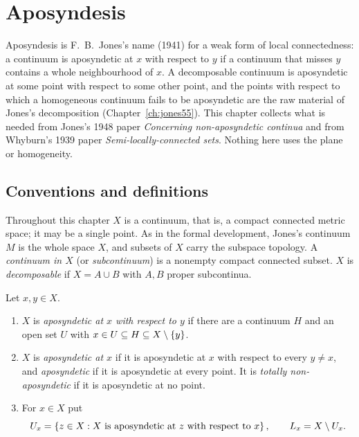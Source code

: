 \chapter{Aposyndesis}\label{ch:apos}

Aposyndesis is F.~B.~Jones's name (1941) for a weak form of local connectedness: a continuum is
aposyndetic at $x$ with respect to $y$ if a continuum that misses $y$ contains a whole neighbourhood of
$x$. A decomposable continuum is aposyndetic at some point with respect to some other point, and the
points with respect to which a homogeneous continuum fails to be aposyndetic are the raw material of
Jones's decomposition (Chapter~\ref{ch:jones55}). This chapter collects what is needed from Jones's
1948 paper \emph{Concerning non-aposyndetic continua} and from Whyburn's 1939 paper
\emph{Semi-locally-connected sets}. Nothing here uses the plane or homogeneity.

\section{Conventions and definitions}

Throughout this chapter $X$ is a continuum, that is, a compact connected metric space; it may be a single
point. As in the formal development, Jones's continuum $M$ is the whole space $X$, and subsets of $X$
carry the subspace topology. A \emph{continuum in $X$} (or \emph{subcontinuum}) is a nonempty compact
connected subset. $X$ is \emph{decomposable} if $X=A\cup B$ with $A,B$ proper subcontinua.


\begin{definition}\label{def:apos}
Let $x,y\in X$.
\begin{enumerate}[label=(\alph*)]
\item $X$ is \emph{aposyndetic at $x$ with respect to $y$} if there are a continuum $H$ and an open set $U$
with $x\in U\subseteq H\subseteq X\setminus\left\{ y \right\}$.
\item $X$ is \emph{aposyndetic at $x$} if it is aposyndetic at $x$ with respect to every $y\neq x$, and
\emph{aposyndetic} if it is aposyndetic at every point. It is \emph{totally non-aposyndetic} if it is
aposyndetic at no point.
\item For $x\in X$ put
\[
U_{x}=\left\{ z\in X : X\text{ is aposyndetic at }z\text{ with respect to }x \right\},\qquad L_{x}=X\setminus U_{x} .
\]
\end{enumerate}
\end{definition}

